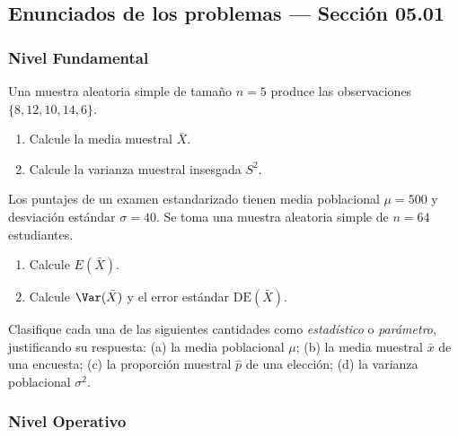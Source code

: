 
\subsection*{Enunciados de los problemas --- Sección 05.01}

\subsubsection*{Nivel Fundamental}

\begin{problema}
	\label{prob:5.1.1}
	Una muestra aleatoria simple de tamaño $n=5$ produce las observaciones $\{8, 12, 10, 14, 6\}$.
	\begin{enumerate}
		\item Calcule la media muestral $\bar{X}$.
		\item Calcule la varianza muestral insesgada $S^{2}$.
	\end{enumerate}
\end{problema}

\begin{problema}
	\label{prob:5.1.2}
	Los puntajes de un examen estandarizado tienen media poblacional $\mu = 500$ y desviación estándar $\sigma = 40$. Se toma una muestra aleatoria simple de $n = 64$ estudiantes.
	\begin{enumerate}
		\item Calcule $E(\bar{X})$.
		\item Calcule $\Var(\bar{X})$ y el error estándar $\text{DE}(\bar{X})$.
	\end{enumerate}
\end{problema}

\begin{problema}
	\label{prob:5.1.3}
	Clasifique cada una de las siguientes cantidades como \emph{estadístico} o \emph{parámetro}, justificando su respuesta: (a) la media poblacional $\mu$; (b) la media muestral $\bar{x}$ de una encuesta; (c) la proporción muestral $\hat{p}$ de una elección; (d) la varianza poblacional $\sigma^{2}$.
\end{problema}

\subsubsection*{Nivel Operativo}

